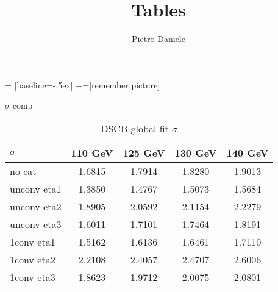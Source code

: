 \documentclass[10pt,UKenglish, leqno, xcolor = dvipsnames]{beamer}
\author{Pietro Daniele}
\title{Tables}
\begin{document}
	 = [baseline=-.5ex]
	+=[remember picture]
	
	\begin{frame}{$\sigma$ comp}
		\vfill
		\centering
		\begin{table}[tbp]
			\centering
			\begin{tabular}{lcccc}
				\toprule[1.5pt]
				$\sigma$	& 110 GeV	& 125 GeV	& 130 GeV	& 140 GeV	\\
				\midrule
				no cat 		& 1.6815 	& 1.7914	& 1.8280	& 1.9013	\\
				unconv eta1 & 1.3850	& 1.4767	& 1.5073	& 1.5684	\\
				unconv eta2 & 1.8905	& 2.0592	& 2.1154	& 2.2279	\\
				unconv eta3 & 1.6011	& 1.7101	& 1.7464	& 1.8191	\\ 
				1conv eta1 	& 1.5162	& 1.6136	& 1.6461	& 1.7110	\\
				1conv eta2 	& 2.2108	& 2.4057	& 2.4707	& 2.6006	\\
				1conv eta3	& 1.8623	& 1.9712	& 2.0075	& 2.0801 	\\
				\bottomrule[1.5pt]
			\end{tabular}
			\caption{DSCB global fit $\sigma$}
		\end{table}
		\vfill
	\end{frame}
\end{document}

